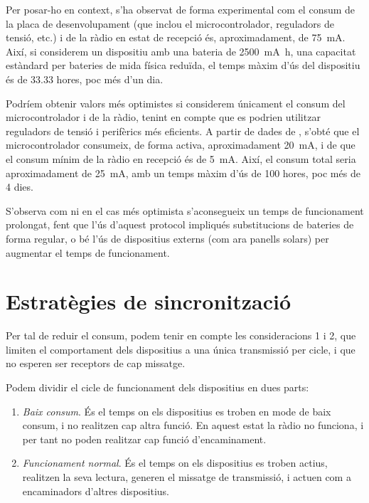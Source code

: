 \documentclass{tfgitic}[2024/07/01]
\begin{document}
{Per posar-ho en context, s'ha observat de forma experimental com el consum de la placa de desenvolupament (que inclou el microcontrolador, reguladors de tensió, etc.) i de la ràdio en estat de recepció és, aproximadament, de \SI{75}{\milli\ampere}. Així, si considerem un dispositiu amb una bateria de \SI{2500}{\milli\ampere\hour}, una capacitat estàndard per bateries de mida física reduïda, el temps màxim d'ús del dispositiu és de 33.33 hores, poc més d'un dia.

Podríem obtenir valors més optimistes si considerem únicament el consum del microcontrolador i de la ràdio, tenint en compte que es podrien utilitzar reguladors de tensió i perifèrics més eficients. A partir de dades de \cite{espressif_current_nodate}, s'obté que el microcontrolador consumeix, de forma activa, aproximadament \SI{20}{\milli\ampere}, i de \cite{semtech_sx1262_nodate} que el consum mínim de la ràdio en recepció és de \SI{5}{\milli\ampere}. Així, el consum total seria aproximadament de \SI{25}{\milli\ampere}, amb un temps màxim d'ús de 100 hores, poc més de 4 dies.

S'observa com ni en el cas més optimista s'aconsegueix un temps de funcionament prolongat, fent que l'ús d'aquest protocol impliqués substitucions de bateries de forma regular, o bé l'ús de dispositius externs (com ara panells solars) per augmentar el temps de funcionament. 

\section{Estratègies de sincronització}
\label{section:estrategiesSync}
Per tal de reduir el consum, podem tenir en compte les consideracions 1 i 2, que limiten el comportament dels dispositius a una única transmissió per cicle, i que no esperen ser receptors de cap missatge. 

Podem dividir el cicle de funcionament dels dispositius en dues parts:
\begin{enumerate}
    \item \emph{Baix consum}. És el temps on els dispositius es troben en mode de baix consum, i no realitzen cap altra funció. En aquest estat la ràdio no funciona, i per tant no poden realitzar cap funció d'encaminament.
    \item \emph{Funcionament normal}. És el temps on els dispositius es troben actius, realitzen la seva lectura, generen el missatge de transmissió, i actuen com a encaminadors d'altres dispositius.
\end{enumerate}

}
\end{document}
